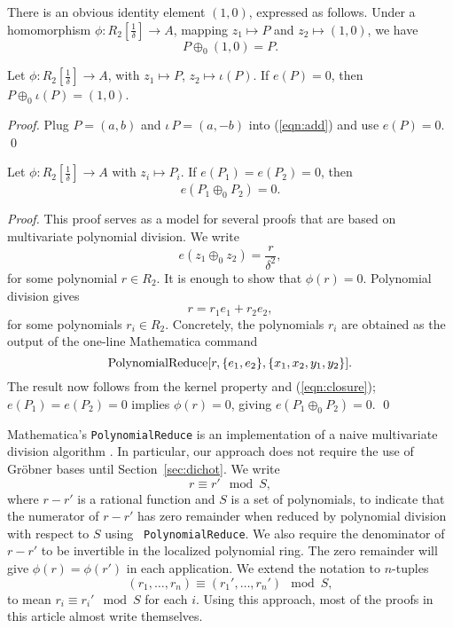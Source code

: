 \documentclass{llncs}
\newcommand{\op}[1]{\hbox{#1}}
\newcommand{\f}[1]{\frac{1}{#1}}
\begin{document}
There is an obvious identity element $(1,0)$, expressed as follows.
Under a homomorphism $\phi:R_2[\f{\delta}]\to A$, mapping $z_1\mapsto
P$ and $z_2\mapsto (1,0)$, we have
\begin{equation}
P\oplus_0(1,0) = P.
\end{equation}

\begin{lemma} [inverse] 
  Let $\phi:R_2[\f{\delta}]\to A$, with $z_1\mapsto P$, $z_2\mapsto
  \iota(P)$.  If $e(P)=0$, then $P\oplus_0 \iota(P) = (1,0)$.
\end{lemma}

\begin{proof} Plug $P=(a,b)$ and $\iota\,P=(a,-b)$ into
  (\ref{eqn:add}) and use $e(P)=0$.
\qed\end{proof}

\begin{lemma}\label{lemma:closure}
  Let $\phi:R_2[\f{\delta}]\to A$ with $z_i\mapsto P_i$.  If
  $e(P_1)=e(P_2)=0$, then
  \[
  e(P_1 \oplus_0 P_2) = 0.
  \]
\end{lemma}

\begin{proof} This proof serves as a model for several proofs that are
  based on multivariate polynomial division.  We write
\[
e(z_1\oplus_0 z_2) = \frac{r}{\delta^2},
\]
for some polynomial $r \in R_2$.  It is enough to show that
$\phi(r)=0$.  Polynomial division gives
\begin{equation}\label{eqn:closure}
r= r_1 e_1 + r_2 e_2,
\end{equation}
for some polynomials $r_i\in R_2$.  Concretely, the polynomials $r_i$
are obtained as the output of the one-line Mathematica command
\[
\op{PolynomialReduce}[r,\{e_1,e_2\},\{x_1,x_2,y_1,y_2\}].
\]
The result now follows from the kernel property and
(\ref{eqn:closure}); $ e(P_1) = e(P_2) = 0$ implies $\phi(r)= 0$,
giving ${e}(P_1\oplus_0 P_2)=0$.
\qed\end{proof}

Mathematica's {\tt PolynomialReduce} is an implementation of a naive
multivariate division algorithm \cite{cox1992ideals}.  In particular,
our approach does not require the use of Gr\"obner bases until
Section~\ref{sec:dichot}.  We write
\[
r \equiv r' \mod S,
\]
where $r-r'$ is a rational function and $S$ is a set of polynomials,
to indicate that the numerator of $r-r'$ has zero remainder when
reduced by polynomial division with respect to $S$ using {\tt
  PolynomialReduce}.  We also require the denominator of $r-r'$ to be
invertible in the localized polynomial ring.  The zero remainder will
give $\phi(r)=\phi(r')$ in each application.  We extend the notation
to $n$-tuples
\[
(r_1,\ldots,r_n) \equiv (r_1',\ldots,r_n') \mod S,
\]
to mean $r_i \equiv r_i' \mod S$ for each $i$.  Using this approach,
most of the proofs in this article almost write themselves.
\end{document}
